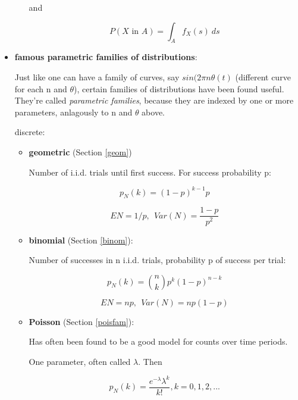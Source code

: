 \begin{itemize}
\begin{itemize}
   and

   \begin{equation}
   P(X \textrm{ in } A) = \int_A f_X(s) ~ ds
   \end{equation}

   \end{itemize}

\item {\bf famous parametric families of distributions}:

Just like one can have a family of curves, say $sin(2\pi n \theta(t)$
(different curve for each n and $\theta$), certain families of
distributions have been found useful.  They're called {\it parametric
families}, because they are indexed by one or more parameters,
anlagously to n and $\theta$ above.

discrete:

   \begin{itemize}

   \item {\bf geometric} (Section \ref{geom})

   Number of i.i.d. trials until first success.  For success probability p: 

   \begin{equation}
   p_N(k) = (1-p)^{k-1} p
   \end{equation}

   \begin{equation}
   EN = 1/p, ~~ Var(N) =  \frac{1-p}{p^2}
   \end{equation}

   \item {\bf binomial} (Section \ref{binom}):

   Number of successes in n i.i.d. trials, probability p of success per
   trial:

   \begin{equation}
   p_N(k) = \binom{n}{k} p^k (1-p)^{n-k}  
   \end{equation}

   \begin{equation}
   EN = np, ~~ Var(N) = np(1-p)
   \end{equation}

   \item {\bf Poisson} (Section \ref{poisfam}):

   Has often been found to be a good model for counts over time periods.

   One parameter, often called $\lambda$.  Then

   \begin{equation}
   p_N(k) = \frac{e^{- \lambda} \lambda^k}{k!}, k = 0,1,2,...
   \end{equation}


\end{itemize}
\end{itemize}
